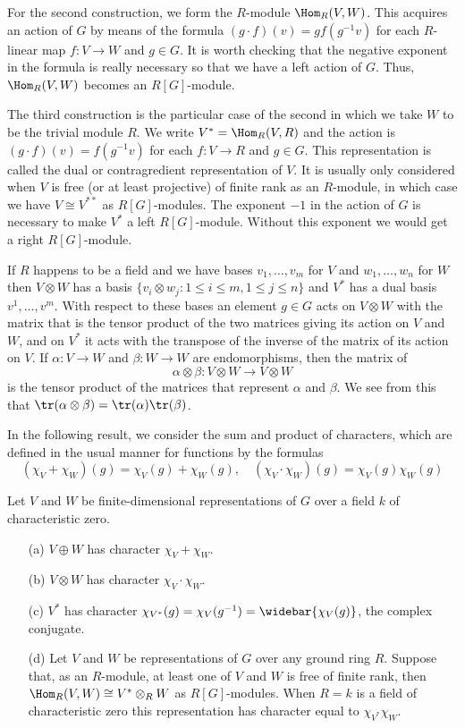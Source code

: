 For the second construction, we form the $R$-module $\Hom_R(V,W)$. This acquires an action of $G$ by means of the formula $(g\cdot f)(v)=gf(g^{-1}v)$ for each $R$-linear map $f:V\to W$ and $g\in G$. It is worth checking that the negative exponent in the formula is really necessary so that we have a left action of $G$. Thus, $\Hom_R(V,W)$ becomes an $R[G]$-module.\par
The third construction is the particular case of the second in which we take $W$ to be the trivial module $R$. We write $V^*=\Hom_R(V,R)$ and the action is $(g\cdot f)(v)=f(g^{-1}v)$ for each $f:V\to R$ and $g\in G$. This representation is called the dual or contragredient representation of $V$. It is usually only considered when $V$ is free (or at least projective) of finite rank as an $R$-module, in which case we have $V\cong V^{**}$ as $R[G]$-modules. The exponent $-1$ in the action of $G$ is necessary to make $V^*$ a left $R[G]$-module. Without this exponent we would get a right $R[G]$-module.\par
If $R$ happens to be a field and we have bases $v_1,\dots,v_m$ for $V$ and $w_1,\dots,w_n$ for $W$ then $V\otimes W$ has a basis $\{v_i\otimes w_j:1\leq i\leq m,1\leq j\leq n\}$ and $V^*$ has a dual basis $v^1,\dots,v^m$. With respect to these bases an element $g\in G$ acts on $V\otimes W$ with the matrix that is the tensor product of the two matrices giving its action on $V$ and $W$, and on $V^*$ it acts with the transpose of the inverse of the matrix of its action on $V$. If $\alpha:V\to W$ and $\beta:W\to W$ are endomorphisms, then the matrix of
\[\alpha\otimes\beta:V\otimes W\to V\otimes W\]
is the tensor product of the matrices that represent $\alpha$ and $\beta$. We see from this that $\tr(\alpha\otimes\beta)=\tr(\alpha)\tr(\beta)$.\par
In the following result, we consider the sum and product of characters, which are defined in the usual manner for functions by the formulas
\[(\chi_V+\chi_W)(g)=\chi_V(g)+\chi_W(g),\quad(\chi_V\cdot\chi_W)(g)=\chi_V(g)\chi_W(g)\]
\begin{proposition}\label{character of sum and tensor prod}
Let $V$ and $W$ be finite-dimensional representations of $G$ over a field $k$ of characteristic zero.
\begin{itemize}
\item[(a)] $V\oplus W$ has character $\chi_V+\chi_W$.
\item[(b)] $V\otimes W$ has character $\chi_V\cdot\chi_W$.
\item[(c)] $V^*$ has character $\chi_{V^*}(g)=\chi_V(g^{-1})=\widebar{\chi_V(g)}$, the complex conjugate.
\item[(d)] Let $V$ and $W$ be representations of $G$ over any ground ring $R$. Suppose that, as an $R$-module, at least one of $V$ and $W$ is free of finite rank, then $\Hom_R(V,W)\cong V^*\otimes_RW$ as $R[G]$-modules. When $R=k$ is a field of characteristic zero this representation has character equal to $\chi_{V^*}\chi_W$.
\end{itemize}
\end{proposition}
